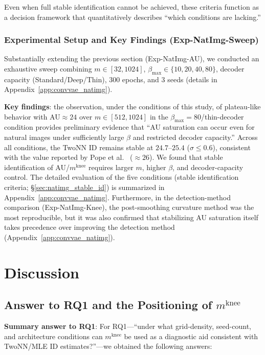 \documentclass[make,article,submit,pdftex,moreauthors]{Definitions/mdpi}
\newcommand{\mknee}{m^{\mathrm{knee}}}
\begin{document}
Even when full stable identification cannot be achieved, these criteria
function as a decision framework that quantitatively describes ``which
conditions are lacking.''

\subsubsection*{Experimental Setup and Key Findings (Exp-NatImg-Sweep)}

Substantially extending the previous section (Exp-NatImg-AU), we conducted an
exhaustive sweep combining $m \in [32, 1024]$,
$\beta_{\max} \in \{10,20,40,80\}$, decoder capacity (Standard/Deep/Thin),
300 epochs, and 3 seeds (details in Appendix~\ref{app:convvae_natimg}).

\textbf{Key findings}:
the observation, under the conditions of this study, of plateau-like behavior
with AU$\approx 24$ over $m \in [512, 1024]$ in the
$\beta_{\max}=80$/thin-decoder condition provides preliminary evidence that
``AU saturation can occur even for natural images under sufficiently large
$\beta$ and restricted decoder capacity.''
Across all conditions, the TwoNN ID remains stable at $24.7$--$25.4$
($\sigma \leq 0.6$), consistent with the value reported by Pope et
al.~\cite{pope2021intrinsic} ($\approx 26$).
We found that stable identification of AU/$\mknee$ requires larger $m$, higher
$\beta$, and decoder-capacity control. The detailed evaluation of the five
conditions (stable identification criteria; \S\ref{sec:natimg_stable_id}) is
summarized in Appendix~\ref{app:convvae_natimg}.
Furthermore, in the detection-method comparison (Exp-NatImg-Knee), the
post-smoothing curvature method was the most reproducible, but it was also
confirmed that stabilizing AU saturation itself takes precedence over
improving the detection method (Appendix~\ref{app:convvae_natimg}).

\section{Discussion}\label{sec:discussion}

\subsection{Answer to RQ1 and the Positioning of $\mknee$}\label{sec:disc_mknee}

\textbf{Summary answer to RQ1}: For RQ1---``under what grid-density, seed-count,
and architecture conditions can $\mknee$ be used as a diagnostic aid consistent
with TwoNN/MLE ID estimates?''---we obtained the following answers:
\end{document}
